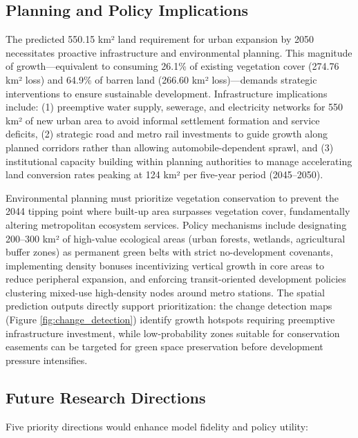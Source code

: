 \documentclass[conference]{IEEEtran}
\begin{document}
\subsection{Planning and Policy Implications}

The predicted 550.15 km² land requirement for urban expansion by 2050 necessitates proactive infrastructure and environmental planning. This magnitude of growth—equivalent to consuming 26.1\% of existing vegetation cover (274.76 km² loss) and 64.9\% of barren land (266.60 km² loss)—demands strategic interventions to ensure sustainable development. Infrastructure implications include: (1) preemptive water supply, sewerage, and electricity networks for 550 km² of new urban area to avoid informal settlement formation and service deficits, (2) strategic road and metro rail investments to guide growth along planned corridors rather than allowing automobile-dependent sprawl, and (3) institutional capacity building within planning authorities to manage accelerating land conversion rates peaking at 124 km² per five-year period (2045--2050).

Environmental planning must prioritize vegetation conservation to prevent the 2044 tipping point where built-up area surpasses vegetation cover, fundamentally altering metropolitan ecosystem services. Policy mechanisms include designating 200--300 km² of high-value ecological areas (urban forests, wetlands, agricultural buffer zones) as permanent green belts with strict no-development covenants, implementing density bonuses incentivizing vertical growth in core areas to reduce peripheral expansion, and enforcing transit-oriented development policies clustering mixed-use high-density nodes around metro stations. The spatial prediction outputs directly support prioritization: the change detection maps (Figure \ref{fig:change_detection}) identify growth hotspots requiring preemptive infrastructure investment, while low-probability zones suitable for conservation easements can be targeted for green space preservation before development pressure intensifies.

\subsection{Future Research Directions}

Five priority directions would enhance model fidelity and policy utility:
\end{document}
